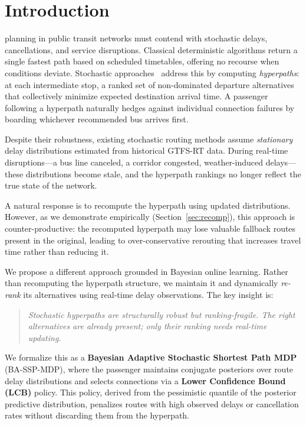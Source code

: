 \documentclass[journal]{IEEEtran}
\begin{document}
\section{Introduction}
\label{sec:intro}

 planning in public transit networks must contend with stochastic delays, cancellations, and service disruptions. Classical deterministic algorithms return a single fastest path based on scheduled timetables, offering no recourse when conditions deviate. Stochastic approaches~\cite{durner2024,dibbelt2013} address this by computing \emph{hyperpaths}: at each intermediate stop, a ranked set of non-dominated departure alternatives that collectively minimize expected destination arrival time. A passenger following a hyperpath naturally hedges against individual connection failures by boarding whichever recommended bus arrives first.

Despite their robustness, existing stochastic routing methods assume \emph{stationary} delay distributions estimated from historical GTFS-RT data. During real-time disruptions---a bus line canceled, a corridor congested, weather-induced delays---these distributions become stale, and the hyperpath rankings no longer reflect the true state of the network.

A natural response is to recompute the hyperpath using updated distributions. However, as we demonstrate empirically (Section~\ref{sec:recomp}), this approach is counter-productive: the recomputed hyperpath may lose valuable fallback routes present in the original, leading to over-conservative rerouting that increases travel time rather than reducing it.

We propose a different approach grounded in Bayesian online learning. Rather than recomputing the hyperpath structure, we maintain it and dynamically \emph{re-rank} its alternatives using real-time delay observations. The key insight is:

\begin{quote}
\emph{Stochastic hyperpaths are structurally robust but ranking-fragile. The right alternatives are already present; only their ranking needs real-time updating.}
\end{quote}

We formalize this as a \textbf{Bayesian Adaptive Stochastic Shortest Path MDP} (BA-SSP-MDP), where the passenger maintains conjugate posteriors over route delay distributions and selects connections via a \textbf{Lower Confidence Bound (LCB)} policy. This policy, derived from the pessimistic quantile of the posterior predictive distribution, penalizes routes with high observed delays or cancellation rates without discarding them from the hyperpath.
\end{document}
